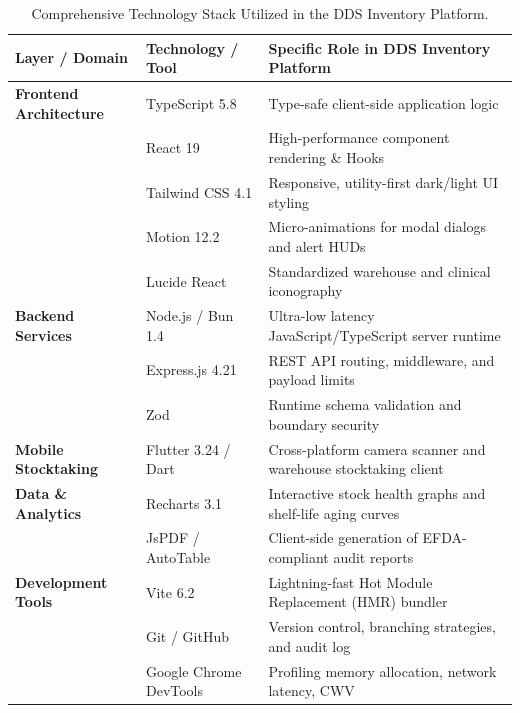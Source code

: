 \begin{table}[htbp]
\centering
\caption{Comprehensive Technology Stack Utilized in the DDS Inventory Platform.}
\label{tab:tech_stack}
\begin{tabularx}{\textwidth}{@{}p{}p{}X@{}}
\toprule
\textbf{Layer / Domain} & \textbf{Technology / Tool} & \textbf{Specific Role in DDS Inventory Platform} \\
\midrule
\textbf{Frontend Architecture} & TypeScript 5.8 & Type-safe client-side application logic \\
                                & React 19 & High-performance component rendering \& Hooks \\
                                & Tailwind CSS 4.1 & Responsive, utility-first dark/light UI styling \\
                                & Motion 12.2 & Micro-animations for modal dialogs and alert HUDs \\
                                & Lucide React & Standardized warehouse and clinical iconography \\
\midrule
\textbf{Backend Services}      & Node.js / Bun 1.4 & Ultra-low latency JavaScript/TypeScript server runtime \\
                                & Express.js 4.21 & REST API routing, middleware, and payload limits \\
                                & Zod & Runtime schema validation and boundary security \\
\midrule
\textbf{Mobile Stocktaking}    & Flutter 3.24 / Dart & Cross-platform camera scanner and warehouse stocktaking client \\
\midrule
\textbf{Data \& Analytics}     & Recharts 3.1 & Interactive stock health graphs and shelf-life aging curves \\
                                & JsPDF / AutoTable & Client-side generation of EFDA-compliant audit reports \\
\midrule
\textbf{Development Tools}     & Vite 6.2 & Lightning-fast Hot Module Replacement (HMR) bundler \\
                                & Git / GitHub & Version control, branching strategies, and audit log \\
                                & Google Chrome DevTools & Profiling memory allocation, network latency, CWV \\
\bottomrule
\end{tabularx}
\end{table}


